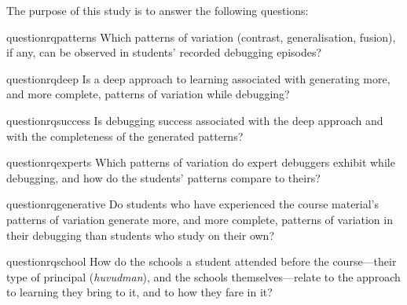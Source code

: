 The purpose of this study is to answer the following questions:
\begin{frame}[allowframebreaks]
\begin{restatable}{question}{rqpatterns}\label{rq:patterns}
  Which patterns of variation (contrast, generalisation, fusion), if any,
  can be observed in students' recorded debugging episodes?
\end{restatable}
\begin{restatable}{question}{rqdeep}\label{rq:deep}
  Is a deep approach to learning associated with generating more, and more
  complete, patterns of variation while debugging?
\end{restatable}
\begin{restatable}{question}{rqsuccess}\label{rq:success}
  Is debugging success associated with the deep approach and with the
  completeness of the generated patterns?
\end{restatable}
\begin{restatable}{question}{rqexperts}\label{rq:experts}
  Which patterns of variation do expert debuggers exhibit while debugging,
  and how do the students' patterns compare to theirs?
\end{restatable}
\begin{restatable}{question}{rqgenerative}\label{rq:generative}
  Do students who have experienced the course material's patterns of
  variation generate more, and more complete, patterns of variation in
  their debugging than students who study on their own?
\end{restatable}
\begin{restatable}{question}{rqschool}\label{rq:school}
  How do the schools a student attended before the course---their type
  of principal (\emph{huvudman}), and the schools themselves---relate to
  the approach to learning they bring to it, and to how they fare in it?
\end{restatable}
\end{frame}

